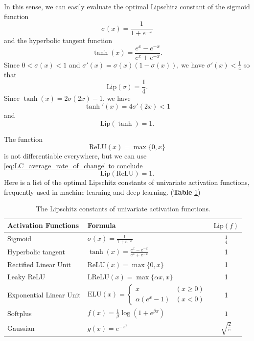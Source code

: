\documentclass[11pt]{report}
\renewcommand\arraystretch{1.3} %
\newcommand\lip{\ensuremath{\text{Lip}}}
\begin{document}
In this sense, we can easily evaluate the optimal Lipschitz constant of the sigmoid function
\begin{equation}\label{eq:sigmoid}
\sigma(x)=\frac1{1+e^{-x}}
\end{equation}
and the hyperbolic tangent function
\begin{equation}\label{eq:tanh}
\tanh(x)=\frac{e^x-e^{-x}}{e^x+e^{-x}}.
\end{equation}
Since \(0<\sigma(x)<1\) and \(\sigma'(x)=\sigma(x)\left(1-\sigma(x)\right)\), we have \(\sigma'(x)<\frac14\) so that
\begin{equation}\label{eq:sigmoid_LC}
\lip(\sigma)=\frac14.
\end{equation}
Since \(\tanh(x)=2\sigma(2x)-1\), we have
\[\tanh'(x)=4\sigma'(2x)<1\]
and
\begin{equation}\label{eq:tanh_LC}
\lip(\tanh)=1.
\end{equation}

The  function
\begin{equation}\label{eq:ReLU}
\text{ReLU}(x)=\max\{0,x\}
\end{equation}
 is not differentiable everywhere, but we can use \eqref{eq:LC_average_rate_of_change} to conclude
\begin{equation}\label{eq:ReLU_LC}
\lip(\text{ReLU})=1.
\end{equation}
Here is a list of the optimal Lipschitz constants of univariate activation functions, frequently used in machine learning and deep learning. (\textbf{Table} \ref{tab:univariate_activation_functions})
 
\renewcommand\arraystretch{1.5}
\begin{table}[ht]
\centering
\caption{The Lipschitz constants of univariate activation functions.}
\label{tab:univariate_activation_functions}
\begin{tabular}[t]{llc}
\toprule
Activation Functions	&Formula									& $\lip(f)$\\
\midrule
Sigmoid				&$\sigma(x)=\frac1{1+e^{-x}}$				&$\frac14$\\
Hyperbolic tangent	&$\tanh(x)=\frac{e^x-e^{-x}}{e^x+e^{-x}}$	&1\\
Rectified Linear Unit	&$\text{ReLU}(x)=\max\{0,x\}$			&1\\
Leaky ReLU			&$\text{LReLU}(x)=\max\{\alpha x,x\}$	&1\\
Exponential Linear Unit&$\text{ELU}(x)=
\begin{cases}x&(x\ge0)\\\alpha(e^x-1)&(x<0)\end{cases}$	&1\\
Softplus			&$f(x)=\frac1\beta\log(1+e^{\beta x})$	&$1$\\
Gaussian			&$g(x)=e^{-x^2}$								&$\sqrt{\frac2e}$\\
\bottomrule
\end{tabular}
\end{table}
\end{document}

